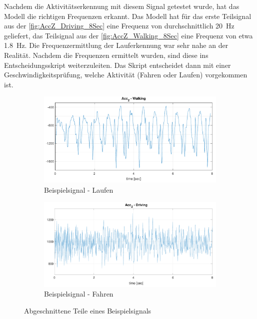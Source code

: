 Nachdem die Aktivitätserkennung mit diesem Signal getestet wurde, hat das Modell die richtigen Frequenzen erkannt.
Das Modell hat für das erste Teilsignal aus der \autoref{fig:AccZ_Driving_8Sec} eine Frequenz von durchschnittlich \SI{20}{\hertz} geliefert, das Teilsignal aus der \autoref{fig:AccZ_Walking_8Sec} eine Frequenz von etwa \SI{1,8}{\hertz}. Die Frequenzermittlung der Lauferkennung war sehr nahe an der Realität.
Nachdem die Frequenzen ermittelt wurden, sind diese ins Entscheidungsskript weiterzuleiten. Das Skript entscheidet dann mit einer Geschwindigkeitsprüfung, welche Aktivität (Fahren oder Laufen) vorgekommen ist.


\begin{figure}[htpb]
	\centering
	\begin{subfigure}{\textwidth}
		\centering
		\includegraphics[width=\textwidth]{Bilder/AccZ_Walking_8Sec_mat_2.pdf}
		\caption{Beispielsignal - Laufen}
		\label{fig:AccZ_Driving_8Sec}
	\end{subfigure}
	\hfill
	\begin{subfigure}{\textwidth}
		\centering
		\includegraphics[width=\textwidth]{Bilder/AccZ_Driving_8Sec_mat1_2.pdf} 
		\caption{Beispielsignal - Fahren}
		\label{fig:AccZ_Walking_8Sec}
	\end{subfigure}
	\caption{Abgeschnittene Teile eines Beispielsignals}
	\label{fig:AbschnitteBeispielsignal}
\end{figure}

